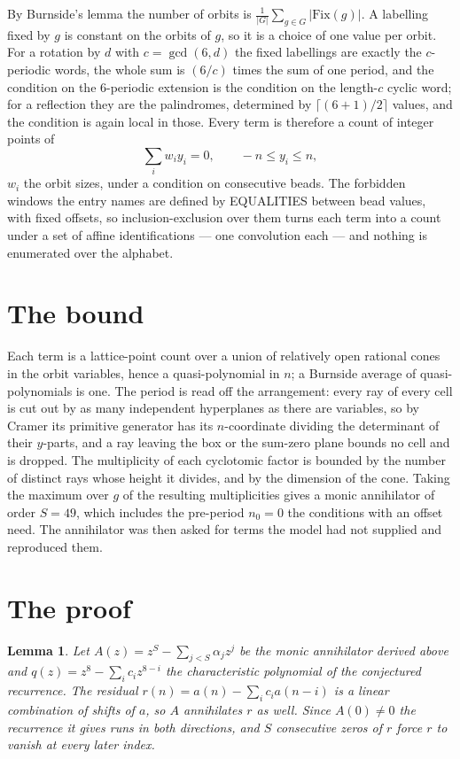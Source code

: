 \documentclass[11pt,a4paper]{article}
\theoremstyle{plain}
\newtheorem{lemma}[theorem]{Lemma}
\theoremstyle{definition}
\begin{document}
By Burnside's lemma the number of orbits is $\frac{1}{|G|}\sum_{g\in G}|\mathrm{Fix}(g)|$.
A labelling fixed by $g$ is constant on the orbits of $g$, so it is a choice of one value per
orbit. For a rotation by $d$ with $c=\gcd(6,d)$ the fixed labellings are exactly the
$c$-periodic words, the whole sum is $(6/c)$ times the sum of one period, and the condition on
the $6$-periodic extension is the condition on the length-$c$ cyclic word; for a reflection
they are the palindromes, determined by $\lceil(6+1)/2\rceil$ values, and the condition is
again local in those. Every term is therefore a count of integer points of
\[
\sum_i w_i y_i = 0, \qquad -n \le y_i \le n,
\]
$w_i$ the orbit sizes, under a condition on consecutive beads. The forbidden windows the entry
names are defined by EQUALITIES between bead values, with fixed offsets, so inclusion-exclusion
over them turns each term into a count under a set of affine identifications --- one
convolution each --- and nothing is enumerated over the alphabet.

\section{The bound}

Each term is a lattice-point count over a union of relatively open rational cones in the orbit
variables, hence a quasi-polynomial in $n$; a Burnside average of quasi-polynomials is one. The
period is read off the arrangement: every ray of every cell is cut out by as many independent
hyperplanes as there are variables, so by Cramer its primitive generator has its $n$-coordinate
dividing the determinant of their $y$-parts, and a ray leaving the box or the sum-zero plane
bounds no cell and is dropped. The multiplicity of each cyclotomic factor is bounded by the
number of distinct rays whose height it divides, and by the dimension of the cone. Taking the
maximum over $g$ of the resulting multiplicities gives a monic annihilator of order
$S=49$, which includes the pre-period $n_0=0$ the conditions with an offset need. The
annihilator was then asked for terms the model had not supplied and reproduced them.

\section{The proof}

\begin{lemma}\label{lem:crit}
Let $A(z)=z^S-\sum_{j<S}\alpha_jz^{j}$ be the monic annihilator derived above and
$q(z)=z^{8}-\sum_ic_iz^{8-i}$ the characteristic polynomial of the conjectured
recurrence. The residual $r(n)=a(n)-\sum_ic_ia(n-i)$ is a linear combination of shifts of $a$,
so $A$ annihilates $r$ as well. Since $A(0)\ne0$ the recurrence it gives runs in both
directions, and $S$ consecutive zeros of $r$ force $r$ to vanish at every later index.
\end{lemma}
\end{document}
